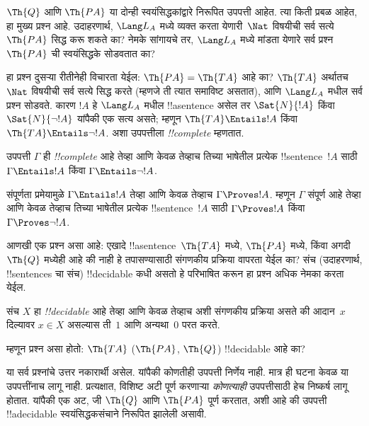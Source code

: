 \documentclass[../../../include/open-logic-section]{subfiles}
\begin{document}
$\Th{Q}$ आणि $\Th{PA}$ या दोन्ही स्वयंसिद्धकांद्वारे निरूपित
उपपत्ती आहेत. त्या किती प्रबळ आहेत, हा मुख्य प्रश्न आहे.
उदाहरणार्थ, $\Lang L_A$ मध्ये व्यक्त करता येणारी~$\Nat$ विषयीची
सर्व सत्ये $\Th{PA}$ सिद्ध करू शकते का? नेमके सांगायचे तर,
$\Lang L_A$ मध्ये मांडता येणारे सर्व प्रश्न $\Th{PA}$ ची
स्वयंसिद्धके सोडवतात का?

हा प्रश्न दुसऱ्या रीतीनेही विचारता येईल: $\Th{PA} = \Th{TA}$
आहे का? $\Th{TA}$ अर्थातच~$\Nat$ विषयीची सर्व सत्ये सिद्ध
करते (म्हणजे ती त्यात समाविष्ट असतात), आणि $\Lang L_A$ मधील
सर्व प्रश्न सोडवते. कारण $!A$ हे $\Lang L_A$ मधील !!a{sentence}
असेल तर $\Sat{N}{!A}$ किंवा $\Sat{N}{\lnot !A}$ यांपैकी
एक सत्य असते; म्हणून $\Th{TA}
\Entails !A$ किंवा $\Th{TA} \Entails \lnot !A$. अशा उपपत्तीला
\emph{!!{complete}} म्हणतात.

\begin{defn}
उपपत्ती $\Gamma$ ही \emph{!!{complete}} आहे तेव्हा आणि केवळ तेव्हाच तिच्या
भाषेतील प्रत्येक !!{sentence}~$!A$ साठी $\Gamma \Entails !A$
किंवा $\Gamma \Entails \lnot !A$.
\end{defn}

\begin{explain}
संपूर्णता प्रमेयामुळे $\Gamma \Entails !A$ तेव्हा आणि केवळ तेव्हाच
$\Gamma \Proves
!A$. म्हणून $\Gamma$ संपूर्ण आहे तेव्हा आणि केवळ तेव्हाच तिच्या भाषेतील
प्रत्येक !!{sentence}~$!A$ साठी $\Gamma \Proves !A$ किंवा
$\Gamma \Proves \lnot !A$.
\end{explain}

आणखी एक प्रश्न असा आहे: एखादे !!a{sentence}~$\Th{TA}$ मध्ये,
$\Th{PA}$ मध्ये, किंवा अगदी~$\Th{Q}$ मध्येही आहे की नाही हे
तपासण्यासाठी संगणकीय प्रक्रिया वापरता येईल का? संच (उदाहरणार्थ,
!!{sentence}s चा संच) !!{decidable} कधी असतो हे परिभाषित करून हा
प्रश्न अधिक नेमका करता येईल.

\begin{defn}
संच $X$ हा \emph{!!{decidable}} आहे तेव्हा आणि केवळ तेव्हाच अशी संगणकीय प्रक्रिया
असते की आदान~$x$ दिल्यावर $x \in X$ असल्यास ती~$1$ आणि
अन्यथा~$0$ परत करते.
\end{defn}

म्हणून प्रश्न असा होतो: $\Th{TA}$ ($\Th{PA}$, $\Th{Q}$) !!{decidable} आहे का?

या सर्व प्रश्नांचे उत्तर नकारार्थी असेल. यांपैकी कोणतीही उपपत्ती
निर्णेय नाही. मात्र ही घटना केवळ या उपपत्तींनाच लागू नाही. प्रत्यक्षात,
विशिष्ट अटी पूर्ण करणाऱ्या \emph{कोणत्याही} उपपत्तीसाठी हेच निष्कर्ष
लागू होतात. यांपैकी एक अट, जी $\Th{Q}$ आणि $\Th{PA}$ पूर्ण करतात,
अशी आहे की उपपत्ती !!a{decidable} स्वयंसिद्धकसंचाने निरूपित झालेली असावी.
\end{document}
